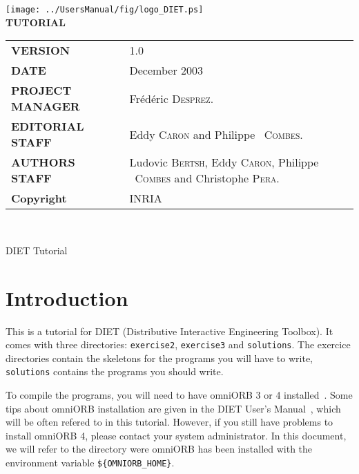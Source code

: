 \documentclass[11pt,a4paper]{article}
\begin{document}

\thispagestyle{empty}
\vspace*{3cm}
\vspace*{3cm}

\begin{center}
\texttt{[image: ../UsersManual/fig/logo\_DIET.ps]}\\[2ex]
\textbf{\Huge TUTORIAL\\[2ex]}
\end{center}

\vfill


\noindent
\small{
\begin{tabular}{ll}
  \textbf{VERSION}  & 1.0\\
  \textbf{DATE}     & December 2003\\
  \textbf{PROJECT MANAGER}  & Fr\'ed\'eric \textsc{Desprez}.\\
  \textbf{EDITORIAL STAFF}  & Eddy \textsc{Caron} and Philippe ~\textsc{Combes}.\\
  \textbf{AUTHORS STAFF}    & 
\begin{minipage}[t]{12cm}
  Ludovic \textsc{Bertsh}, Eddy \textsc{Caron}, Philippe ~\textsc{Combes} and Christophe \textsc{Pera}.
\end{minipage} \\
  \textbf{Copyright}& INRIA
\end{tabular}\\
}

\newpage



\begin{center}
{\Huge DIET Tutorial \par}
\end{center}

\section{Introduction}

This is a tutorial for DIET (Distributive Interactive Engineering
Toolbox). It comes with three directories: \texttt{exercise2},
\texttt{exercise3} and \texttt{solutions}. The exercice directories
contain the skeletons for the programs you will have to write,
\texttt{solutions} contains the programs you should write.

To compile the programs, you will need to have omniORB 3 or 4
installed~\cite{UMOmniORB}. Some tips about omniORB installation
are given in the DIET User's Manual~\cite{UMDIET}, which will be often
refered to in this tutorial.  However, if you still have problems to
install omniORB 4, please contact your system administrator.  In this
document, we will refer to the directory were omniORB has been
installed with the environment variable \texttt{\$\{OMNIORB\_HOME\}}.
\end{document}
